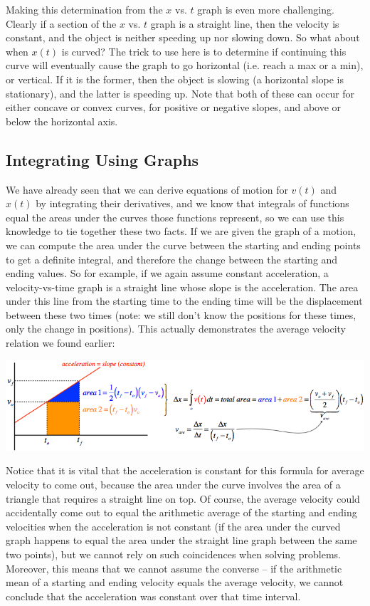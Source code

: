\documentclass[12pt,addpoints]{exam}
\begin{document}
	Making this determination from the $x$ vs. $t$ graph is even more challenging. Clearly if a section of the $x$ vs. $t$ graph is a straight line, then the velocity is constant, and the object is neither speeding up nor slowing down. So what about when $x(t)$ is curved? The trick to use here is to determine if continuing this curve will eventually cause the graph to go horizontal (i.e. reach a max or a min), or vertical. If it is the former, then the object is slowing (a horizontal slope is stationary), and the latter is speeding up. Note that both of these can occur for either concave or convex curves, for positive or negative slopes, and above or below the horizontal axis.
	\begin{center}
		\subsection*{Integrating Using Graphs}
	\end{center}	
	We have already seen that we can derive equations of motion for $v(t)$
	and  $x(t)$ by integrating their derivatives, and we know that integrals of functions equal the areas under the curves those functions represent, so we can use this knowledge to tie together these two facts. If we are given the graph of a motion, we can compute the area under the curve between the starting and ending points to get a definite integral, and therefore the change between the starting and ending values. So for example, if we again assume constant acceleration, a velocity-vs-time graph is a straight line whose slope is the acceleration. The area under this line from the starting time to the ending time will be the displacement between these two times (note: we still don’t know the positions for these times, only the change in positions). This actually demonstrates the average velocity relation we found earlier: \\
	\begin{center}
		\includegraphics[scale=0.85]{int.png}
	\end{center}
	Notice that it is vital that the acceleration is constant for this formula for average velocity to come out, because the area under the curve involves the area of a triangle that requires a straight line on top. Of course, the average velocity could accidentally come out to equal the arithmetic average of the starting and ending velocities when the acceleration is not constant (if the area under the curved graph happens to equal the area under the straight line graph between the same two points), but we cannot rely on such coincidences when solving problems. Moreover, this means that we cannot assume the converse – if the arithmetic mean of a starting and ending velocity equals the average velocity, we cannot conclude that the acceleration was constant over that time interval.
	
	
	
\end{document}

